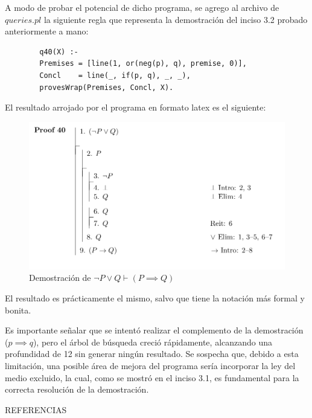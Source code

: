 \documentclass[11pt, letterpaper]{article}
\begin{document}
	A modo de probar el potencial de dicho programa, se agrego al archivo de $queries.pl$ la siguiente regla que representa la demostración del inciso 3.2 probado anteriormente a mano:
	
	
	\begin{verbatim}
		q40(X) :-                                    
		Premises = [line(1, or(neg(p), q), premise, 0)],  
		Concl    = line(_, if(p, q), _, _),    
		provesWrap(Premises, Concl, X).		
	\end{verbatim}

	El resultado arrojado por el programa en formato latex es el siguiente:

	\begin{figure}[h]
		\centering
		\includegraphics[width=1\textwidth]{IM1.png}  %
		\caption{Demostración de $\neg P \vee Q \vdash (P \implies Q)$}
		\label{fig:mi_imagen}
	\end{figure}
	
	
	El resultado es prácticamente el mismo, salvo que tiene la notación más formal y bonita.
		
	Es importante señalar que se intentó realizar el complemento de la demostración ($p \implies q$), pero el árbol de búsqueda creció rápidamente, alcanzando una profundidad de 12 sin generar ningún resultado. Se sospecha que, debido a esta limitación, una posible área de mejora del programa sería incorporar la ley del medio excluido, la cual, como se mostró en el inciso 3.1, es fundamental para la correcta resolución de la demostración.
	
	
	\newpage 
	
	REFERENCIAS


	
	
\end{document}
